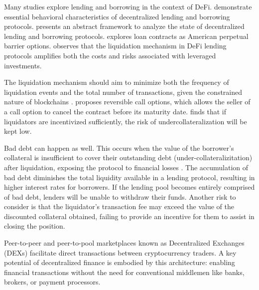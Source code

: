 \documentclass[11pt]{article} %
\begin{document}
Many studies explore lending and borrowing in the context of DeFi. \cite{bartoletti21, bartoletti22} demonstrate essential behavioral characteristics of decentralized lending and borrowing protocols. \cite{perez21} presents an abstract framework to analyze the state of decentralized lending and borrowing protocols. \cite{szpruch24} explores loan contracts as American perpetual barrier options. \cite{mueller24} observes that the liquidation mechanism in DeFi lending protocols amplifies both the costs and risks associated with leveraged investments.

The liquidation mechanism should aim to minimize both the frequency of liquidation events and the total number of transactions, given the constrained nature of blockchains \citep{qin21_1}. \cite{qin23} proposes reversible call options, which allows the seller of a call option to cancel the contract before its maturity date. \cite{iragorri21} finds that if liquidators are incentivized sufficiently, the risk of undercollateralization will be kept low.

Bad debt can happen as well. This occurs when the value of the borrower’s collateral is insufficient to cover their outstanding debt (under-collateralizitation) after liquidation, exposing the protocol to financial losses \citep{gudgeon20}. The accumulation of bad debt diminishes the total liquidity available in a lending protocol, resulting in higher interest rates for borrowers. If the lending pool becomes entirely comprised of bad debt, lenders will be unable to withdraw their funds. Another risk to consider is that the liquidator's transaction fee may exceed the value of the discounted collateral obtained, failing to provide an incentive for them to assist in closing the position.

Peer-to-peer and peer-to-pool marketplaces known as Decentralized Exchanges (DEXs) facilitate direct transactions between cryptocurrency traders. A key potential of decentralized finance is embodied by this architecture: enabling financial transactions without the need for conventional middlemen like banks, brokers, or payment processors.
\end{document}
